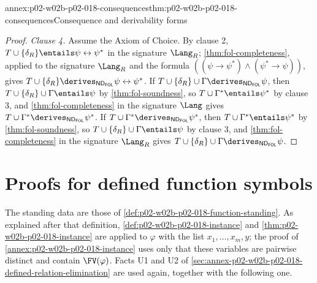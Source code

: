 \begin{annexitem}{annex:p02-w02b-p02-018-consequences}{thm:p02-w02b-p02-018-consequences}{Consequence and derivability forms}
\begin{proof}
\emph{Clause 4.}  Assume the Axiom of Choice.  By clause 2,
\(T\cup\{\delta_R\}\entails\psi\leftrightarrow\psi^{*}\) in the signature
\(\Lang_R\); \cref{thm:fol-completeness}, applied to the signature
\(\Lang_R\) and the formula \(((\psi\to\psi^{*})\land(\psi^{*}\to\psi))\),
gives \(T\cup\{\delta_R\}\derives_{\mathsf{ND}_{\mathsf{FOL}}}
\psi\leftrightarrow\psi^{*}\).  If
\(T\cup\{\delta_R\}\cup\Gamma\derives_{\mathsf{ND}_{\mathsf{FOL}}}\psi\),
then \(T\cup\{\delta_R\}\cup\Gamma\entails\psi\) by
\cref{thm:fol-soundness}, so \(T\cup\Gamma^{*}\entails\psi^{*}\) by
clause 3, and \cref{thm:fol-completeness} in the signature \(\Lang\) gives
\(T\cup\Gamma^{*}\derives_{\mathsf{ND}_{\mathsf{FOL}}}\psi^{*}\).  If
\(T\cup\Gamma^{*}\derives_{\mathsf{ND}_{\mathsf{FOL}}}\psi^{*}\), then
\(T\cup\Gamma^{*}\entails\psi^{*}\) by \cref{thm:fol-soundness}, so
\(T\cup\{\delta_R\}\cup\Gamma\entails\psi\) by clause 3, and
\cref{thm:fol-completeness} in the signature \(\Lang_R\) gives
\(T\cup\{\delta_R\}\cup\Gamma\derives_{\mathsf{ND}_{\mathsf{FOL}}}\psi\).
\end{proof}
\end{annexitem}

\section{Proofs for defined function symbols}
\label{sec:annex-p02-w02b-p02-018-function-symbols}

The standing data are those of \cref{def:p02-w02b-p02-018-function-standing}.
As explained after that definition, \cref{def:p02-w02b-p02-018-instance} and
\cref{thm:p02-w02b-p02-018-instance} are applied to \(\varphi\) with the list
\(x_1,\ldots,x_m,y\); the proof of
\cref{annex:p02-w02b-p02-018-instance} uses only that these variables are
pairwise distinct and contain \(\FV(\varphi)\).  Facts U1 and U2 of
\cref{sec:annex-p02-w02b-p02-018-defined-relation-elimination} are used
again, together with the following one.


